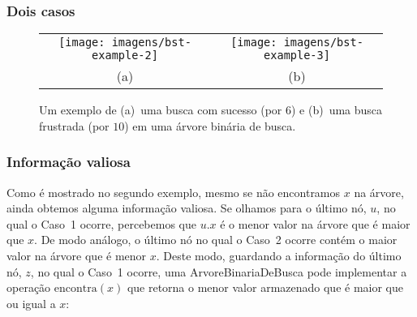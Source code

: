 \documentclass{beamer}
\begin{document}
\begin{frame}
\frametitle{Dois casos}
\begin{figure}
  \begin{center}
    \begin{tabular}{cc}
    \texttt{[image: imagens/bst-example-2]} &
    \texttt{[image: imagens/bst-example-3]} \\
    (a) & (b)
    \end{tabular}
  \end{center}
  \caption{Um exemplo de (a)~uma busca com sucesso (por $6$) e (b)~uma busca frustrada (por $10$) em uma árvore binária de busca.}
\end{figure}
\end{frame}

\begin{frame}
\frametitle{Informação valiosa}
Como é mostrado no segundo exemplo, mesmo se não encontramos \ensuremath{\ensuremath{\ensuremath{\mathit{x}}}} na árvore, ainda obtemos alguma informação valiosa.  Se olhamos para o último nó, \ensuremath{\ensuremath{\ensuremath{\mathit{u}}}}, no qual o Caso~1 ocorre, percebemos que \ensuremath{\ensuremath{\ensuremath{\mathit{u}}.\ensuremath{\mathit{x}}}} é o menor valor na árvore que é maior que \ensuremath{\ensuremath{\ensuremath{\mathit{x}}}}.  De modo análogo,
o último nó no qual o Caso~2 ocorre contém o maior valor na árvore que é menor \ensuremath{\ensuremath{\ensuremath{\mathit{x}}}}.  Deste modo, guardando a informação do último nó, \ensuremath{\ensuremath{\ensuremath{\mathit{z}}}}, no qual o Caso~1 ocorre, uma ArvoreBinariaDeBusca pode implementar a operação \ensuremath{\ensuremath{\mathrm{encontra}(\ensuremath{\mathit{x}})}} que retorna o menor valor armazenado que é maior que ou igual a \ensuremath{\ensuremath{\ensuremath{\mathit{x}}}}:
\end{frame}
\end{document}
